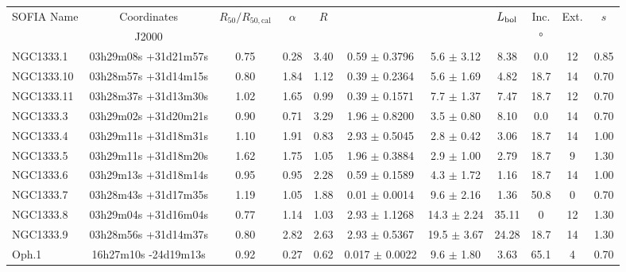 \begin{landscape}
\begin{table}[!h]
\scriptsize
\caption[Fitted parameters]{Fitted parameters for the three clusters where long-wavelength photometry is available.}
\label{tab:FittedParameters}
\vspace{-0.5cm}
\hspace*{-1.5cm}
\begin{center}
\begin{longtable}{lcccccccccc}

\toprule																									
SOFIA Name	&	Coordinates	&	$R_{50}/R_{50,\textrm{cal}}$	&	$\alpha$	&	$R$	&	\Menv			&	\Ltot			&	$L_\textrm{bol}$	&	Inc.	&	Ext.	&	$s$	\\
	&	J2000	&		&		&		&	\si{\Msun}			&	\si{\Lsun}			&	\si{\Lsun}	&	\si{\degree}	&		&		\\
\midrule																									
NGC1333.1	&	03h29m08s +31d21m57s	&	0.75	&	0.28	&	3.40	&	0.59	$\pm$	0.3796	&	5.6	$\pm$	3.12	&	8.38	&	0.0	&	12	&	0.85	\\
NGC1333.10	&	03h28m57s +31d14m15s	&	0.80	&	1.84	&	1.12	&	0.39	$\pm$	0.2364	&	5.6	$\pm$	1.69	&	4.82	&	18.7	&	14	&	0.70	\\
NGC1333.11	&	03h28m37s +31d13m30s	&	1.02	&	1.65	&	0.99	&	0.39	$\pm$	0.1571	&	7.7	$\pm$	1.37	&	7.47	&	18.7	&	12	&	0.70	\\
NGC1333.3	&	03h29m02s +31d20m21s	&	0.90	&	0.71	&	3.29	&	1.96	$\pm$	0.8200	&	3.5	$\pm$	0.80	&	8.10	&	0.0	&	14	&	0.70	\\
NGC1333.4	&	03h29m11s +31d18m31s	&	1.10	&	1.91	&	0.83	&	2.93	$\pm$	0.5045	&	2.8	$\pm$	0.42	&	3.06	&	18.7	&	14	&	1.00	\\
NGC1333.5	&	03h29m11s +31d18m20s	&	1.62	&	1.75	&	1.05	&	1.96	$\pm$	0.3884	&	2.9	$\pm$	1.00	&	2.79	&	18.7	&	9	&	1.30	\\
NGC1333.6	&	03h29m13s +31d18m14s	&	0.95	&	0.95	&	2.28	&	0.59	$\pm$	0.1589	&	4.3	$\pm$	1.72	&	1.16	&	18.7	&	14	&	1.00	\\
NGC1333.7	&	03h28m43s +31d17m35s	&	1.19	&	1.05	&	1.88	&	0.01	$\pm$	0.0014	&	9.6	$\pm$	2.16	&	1.36	&	50.8	&	0	&	0.70	\\
NGC1333.8	&	03h29m04s +31d16m04s	&	0.77	&	1.14	&	1.03	&	2.93	$\pm$	1.1268	&	14.3	$\pm$	2.24	&	35.11	&0	&	12	&	1.30	\\
NGC1333.9	&	03h28m56s +31d14m37s	&	0.80	&	2.82	&	2.63	&	2.93	$\pm$	0.5367	&	19.5	$\pm$	3.67	&	24.28	&	18.7	&	14	&	1.30	\\
Oph.1	&	16h27m10s -24d19m13s	&	0.92	&	0.27	&	0.62	&	0.017	$\pm$	0.0022	&	9.6	$\pm$	1.80	&	3.63	&	65.1	&	4	&	0.70	\\

\end{longtable}
\end{center}
\end{table}
\end{landscape}
